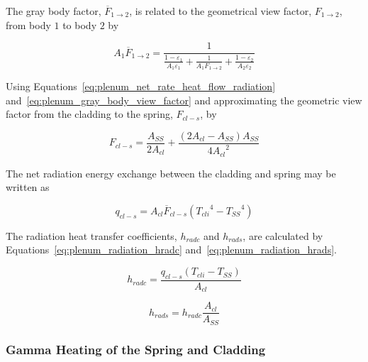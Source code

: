 The gray body factor, \({\overline{F}}_{1 \rightarrow 2}\), is related to the geometrical view
factor, \(F_{1 \rightarrow 2}\), from body \(1\) to body \(2\) by

\begin{equation}
    \label{eq:plenum_gray_body_view_factor}
    A_{1}{\overline{F}}_{1 \rightarrow 2} = \frac{1}{\frac{1 - \varepsilon_{1}}{A_{1}\varepsilon_{1}} + \frac{1}{A_{1}F_{1 \rightarrow 2}} + \frac{1 - \varepsilon_{2}}{A_{2}\varepsilon_{2}}}
\end{equation}

Using Equations~\ref{eq:plenum_net_rate_heat_flow_radiation}
and~\ref{eq:plenum_gray_body_view_factor} and approximating the geometric view factor from the
cladding to the spring, \(F_{cl - s}\), by

\begin{equation}
    \label{eq:plenum_view_factor_cladding_spring}
    F_{cl - s} = \frac{A_{SS}}{2A_{cl}} + \frac{\left( 2A_{cl} - A_{SS} \right)A_{SS}}{4{A_{cl}}^{2}}
\end{equation}

The net radiation energy exchange between the cladding and spring may be written as

\begin{equation}
    \label{eq:plenum_net_radiation_cladding_spring}
    q_{cl - s} = A_{cl}{\overline{F}}_{cl - s}\left( {T_{cli}}^{4} - {T_{SS}}^{4} \right)
\end{equation}

The radiation heat transfer coefficients, $h_{radc}$ and $h_{rads}$, are calculated by
Equations~\ref{eq:plenum_radiation_hradc} and~\ref{eq:plenum_radiation_hrads}.

\begin{equation}
    \label{eq:plenum_radiation_hradc}
    h_{radc} = \frac{q_{cl - s}\left( T_{cli} - T_{SS} \right)}{A_{cl}}
\end{equation}

\begin{equation}
    \label{eq:plenum_radiation_hrads}
    h_{rads} = h_{radc}\frac{A_{cl}}{A_{SS}}
\end{equation}
\subsubsection{Gamma Heating of the Spring and Cladding}\label{gamma-heating-of-the-spring-and-cladding}

